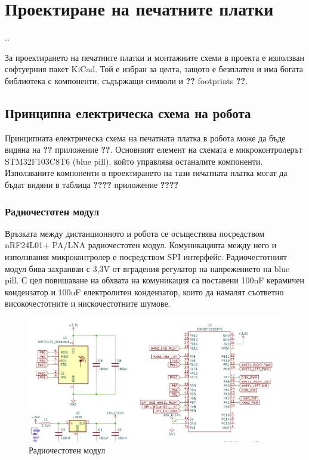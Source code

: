 \chapter{Проектиране на печатните платки}
..

За проектирането на печатните платки и монтажните схеми в проекта е използван софтуерния пакет KiCad. Той е избран за целта, защото е безплатен и има богата библиотека с компоненти, съдържащи символи и \textbf{??} footprints \textbf{??}.


\section{Принципна електрическа схема на робота}

Принципната електрическа схема на печатната платка в робота може да бъде видяна на \textbf{??} приложение \textbf{??}. Основният елемент на схемата е микроконтролерът STM32F103C8T6 (blue pill), който управлява останалите компоненти. Използваните компоненти в проектирането на тази печатната платка могат да бъдат видяни в таблица \textbf{????} приложение \textbf{????}



\subsection{Радиочестотен модул}

Връзката между дистанционното и робота се осъществява посредством nRF24L01+ PA/LNA радиочестотен модул. Комуникацията между него и използвания микроконтролер е посредством SPI интерфейс. Радиочестотният модул бива захранван с 3,3V от вградения регулатор на напрежението на blue pill. С цел повишаване на обхвата на комуникация са поставени 100nF керамичен кондензатор и 100uF електролитен кондензатор, които да намалят съответно високочестотните и нискочестотните шумове.

\begin{figure}[H]
    \centering
    \includegraphics[width=0.6\linewidth]{images/rf-module.png}
    
    \caption{Радиочестотен модул}
    \label{fig:rf-module} 
\end{figure}



